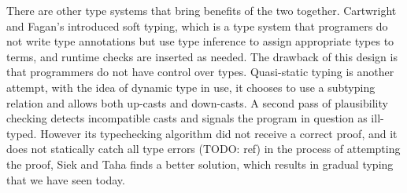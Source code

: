 There are other type systems that bring benefits of the two together.
Cartwright and Fagan's introduced soft typing, which is a type system
that programers do not write type annotations but use type inference to
assign appropriate types to terms, and runtime checks are inserted as needed.
The drawback of this design is that programmers do not have control over types.
Quasi-static typing is another attempt, with the idea of dynamic type in use,
it chooses to use a subtyping relation and allows both up-casts and down-casts.
A second pass of plausibility checking detects incompatible casts and signals the program
in question as ill-typed. However its typechecking algorithm did not receive a correct proof,
and it does not statically catch all type errors (TODO: ref)
in the process of attempting the proof, Siek and Taha finds a better solution, 
which results in gradual typing that we have seen today.










